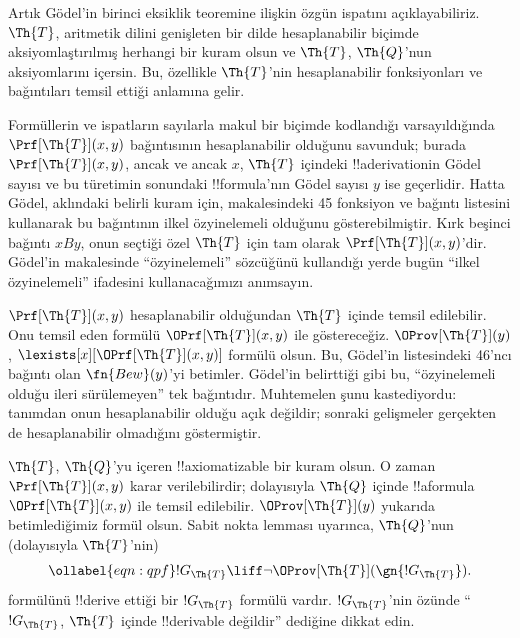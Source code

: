 



Artık G\"odel'in birinci eksiklik teoremine ilişkin özgün ispatını
açıklayabiliriz. $\Th{T}$, aritmetik dilini genişleten bir dilde hesaplanabilir
biçimde aksiyomlaştırılmış herhangi bir kuram olsun ve $\Th{T}$,
$\Th{Q}$'nun aksiyomlarını içersin. Bu, özellikle $\Th{T}$'nin hesaplanabilir
fonksiyonları ve bağıntıları temsil ettiği anlamına gelir.

Formüllerin ve ispatların sayılarla makul bir biçimde kodlandığı
varsayıldığında $\Prf[\Th{T}](x,y)$ bağıntısının hesaplanabilir olduğunu
savunduk; burada $\Prf[\Th{T}](x,y)$, ancak ve ancak $x$, $\Th{T}$ içindeki
!!a{derivation}{}in G\"odel sayısı ve bu türetimin sonundaki !!{formula}'nın
G\"odel sayısı $y$ ise geçerlidir. Hatta G\"odel, aklındaki belirli kuram için, makalesindeki 45
fonksiyon ve bağıntı listesini kullanarak bu bağıntının ilkel özyinelemeli
olduğunu gösterebilmiştir. Kırk beşinci bağıntı $x B y$, onun seçtiği özel
$\Th{T}$ için tam olarak $\Prf[\Th{T}](x,y)$'dir. G\"odel'in makalesinde
``özyinelemeli'' sözcüğünü kullandığı yerde bugün ``ilkel özyinelemeli''
ifadesini kullanacağımızı anımsayın.

$\Prf[\Th{T}](x,y)$ hesaplanabilir olduğundan $\Th{T}$ içinde temsil
edilebilir. Onu temsil eden formülü $\OPrf[\Th{T}](x,y)$ ile göstereceğiz.
$\OProv[\Th{T}](y)$,
$\lexists[x][\OPrf[\Th{T}](x,y)]$ formülü olsun. Bu, G\"odel'in listesindeki
46'ncı bağıntı olan $\fn{Bew}(y)$'yi betimler. G\"odel'in belirttiği gibi bu,
``özyinelemeli olduğu ileri sürülemeyen'' tek bağıntıdır. Muhtemelen şunu
kastediyordu: tanımdan onun hesaplanabilir olduğu açık değildir; sonraki
gelişmeler gerçekten de hesaplanabilir olmadığını göstermiştir.

$\Th{T}$, $\Th{Q}$'yu içeren !!{axiomatizable} bir kuram olsun. O zaman
$\Prf[\Th{T}](x,y)$ karar verilebilirdir; dolayısıyla $\Th{Q}$ içinde
!!a{formula}~$\OPrf[\Th{T}](x,y)$ ile temsil edilebilir. $\OProv[\Th{T}](y)$
yukarıda betimlediğimiz formül olsun. Sabit nokta lemması uyarınca,
$\Th{Q}$'nun (dolayısıyla $\Th{T}$'nin)
\begin{equation}
\ollabel{eqn:qpf}
!G_\Th{T} \liff \lnot \OProv[\Th{T}](\gn{!G_\Th{T}}).
\end{equation}
formülünü !!{derive} ettiği bir $!G_\Th{T}$ formülü vardır. $!G_\Th{T}$'nin
özünde ``$!G_\Th{T}$, $\Th{T}$ içinde !!{derivable} değildir'' dediğine
dikkat edin.


